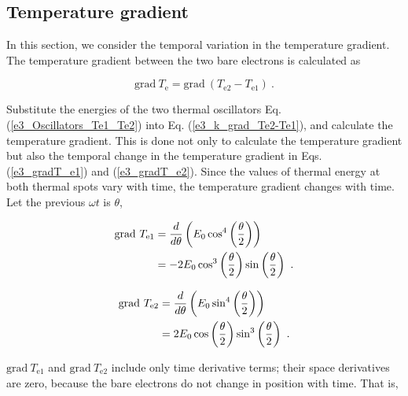 \documentclass[%
 reprint,
 amsmath,amssymb,
 aps,
]{revtex4-1}
\numberwithin{equation}{section}%
\begin{document}
\subsection{Temperature gradient}
\label{Temperature_gradient}

    In this section, we consider the temporal variation in the temperature gradient. The temperature gradient between the two bare electrons is calculated as


        \begin{equation}
            \mathrm{grad} \ T_{\mathrm{e}} = \mathrm{grad} \ (T_{\mathrm{e2}} - T_{\mathrm{e1}})
            \ .
             \label{e3_k_grad_Te2-Te1}                
        \end{equation}

    Substitute the energies of the two thermal oscillators Eq. (\ref{e3_Oscillators_Te1_Te2}) into Eq. (\ref{e3_k_grad_Te2-Te1}), and calculate the temperature gradient. This is done not only to calculate the temperature gradient but also the temporal change in the temperature gradient in Eqs. (\ref{e3_gradT_e1}) and (\ref{e3_gradT_e2}). Since the values of thermal energy at both thermal spots vary with time, the temperature gradient changes with time. Let the previous $\omega t$ is $\theta$,

        \begin{align}
            \mathrm{grad} \ T_{\mathrm{e1}}
                &= \frac{d}{d \theta} \left( E_{0} \cos^{4} \left( \frac{\theta}{2} \right) \right) \notag \\
                &= - 2 E_{0} \cos^{3} \left( \frac{\theta}{2} \right) \sin \left( \frac{\theta}{2} \right)
                \ .
                \label{e3_gradT_e1}
        \end{align}

        \begin{align}
            \mathrm{grad} \ T_{\mathrm{e2}} 
                &= \frac{d}{d \theta} \left( E_{0} \sin^{4} \left( \frac{\theta}{2} \right) \right) \notag \\
                &=   2 E_{0} \cos \left( \frac{\theta}{2} \right) \sin^{3} \left( \frac{\theta}{2} \right)
                \ .
                \label{e3_gradT_e2}
        \end{align}        
        
    $\mathrm{grad} \ T_{\mathrm{e1}}$ and $\mathrm{grad} \ T_{\mathrm{e2}}$ include only time derivative terms; their space derivatives are zero, because the bare electrons do not change in position with time. That is,
\end{document}
